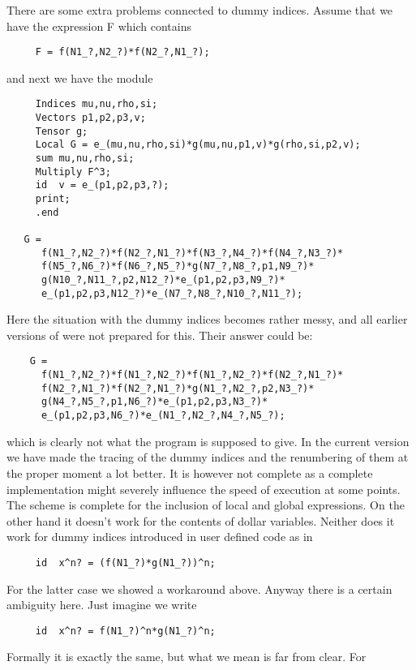 There are some extra problems connected to dummy indices. Assume that we 
have the expression F which contains
\begin{verbatim}
     F = f(N1_?,N2_?)*f(N2_?,N1_?);
\end{verbatim}
and next we have the module
\begin{verbatim}
     Indices mu,nu,rho,si;
     Vectors p1,p2,p3,v;
     Tensor g;
     Local G = e_(mu,nu,rho,si)*g(mu,nu,p1,v)*g(rho,si,p2,v);
     sum mu,nu,rho,si;
     Multiply F^3;
     id  v = e_(p1,p2,p3,?);
     print;
     .end

   G =
      f(N1_?,N2_?)*f(N2_?,N1_?)*f(N3_?,N4_?)*f(N4_?,N3_?)*
      f(N5_?,N6_?)*f(N6_?,N5_?)*g(N7_?,N8_?,p1,N9_?)*
      g(N10_?,N11_?,p2,N12_?)*e_(p1,p2,p3,N9_?)*
      e_(p1,p2,p3,N12_?)*e_(N7_?,N8_?,N10_?,N11_?);
\end{verbatim}
Here the situation with the dummy indices becomes rather messy, and all 
earlier versions of {\FORM} were not prepared for this. Their answer could be:
\begin{verbatim}
    G =
      f(N1_?,N2_?)*f(N1_?,N2_?)*f(N1_?,N2_?)*f(N2_?,N1_?)*
      f(N2_?,N1_?)*f(N2_?,N1_?)*g(N1_?,N2_?,p2,N3_?)*
      g(N4_?,N5_?,p1,N6_?)*e_(p1,p2,p3,N3_?)*
      e_(p1,p2,p3,N6_?)*e_(N1_?,N2_?,N4_?,N5_?);
\end{verbatim}
which is clearly not what the program is supposed to give. In the current 
version we have made the tracing of the dummy indices and the renumbering 
of them at the proper moment a lot better. It is however not complete as a 
complete implementation might severely influence the speed of execution at 
some points. The scheme is complete for the inclusion of local and global 
expressions. On the other hand it doesn't work for the contents of dollar 
variables. Neither does it work for dummy indices 
introduced in user defined code as in
\begin{verbatim}
     id  x^n? = (f(N1_?)*g(N1_?))^n;
\end{verbatim}
For the latter case we showed a workaround above. Anyway there is a certain 
ambiguity here. Just imagine we write
\begin{verbatim}
     id  x^n? = f(N1_?)^n*g(N1_?)^n;
\end{verbatim}
Formally it is exactly the same, but what we mean is far from clear. For 
